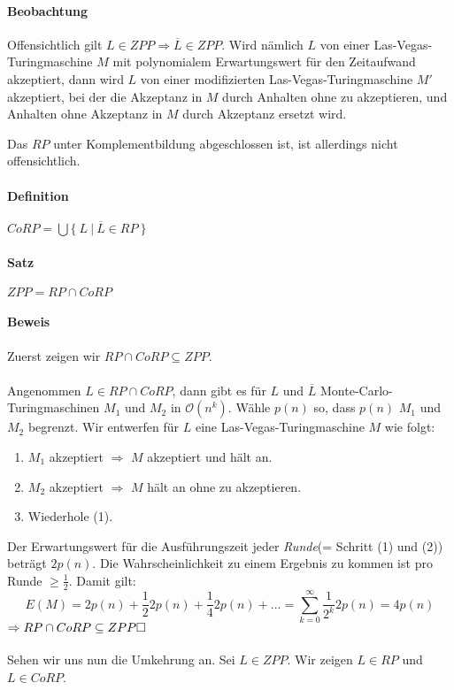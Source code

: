 \paragraph{Beobachtung}
Offensichtlich gilt $L \in ZPP \Rightarrow \overline{L} \in ZPP$.
Wird nämlich $L$ von einer Las-Vegas-Turingmaschine $M$ mit polynomialem Erwartungswert für den Zeitaufwand akzeptiert, dann wird $L$ von einer modifizierten Las-Vegas-Turingmaschine $M'$ akzeptiert, bei der die Akzeptanz in $M$ durch Anhalten ohne zu akzeptieren, und Anhalten ohne Akzeptanz in $M$ durch Akzeptanz ersetzt wird.

Das $RP$ unter Komplementbildung abgeschlossen ist, ist allerdings nicht offensichtlich.

\paragraph{Definition}
$CoRP = \bigcup \bigl\{\ L\ \bigl\lvert\ \overline{L} \in RP\ \}$

\paragraph{Satz}
$ZPP = RP \cap CoRP$

\paragraph{Beweis}
Zuerst zeigen wir $RP \cap CoRP \subseteq ZPP$.\\
\\
Angenommen $L \in RP \cap CoRP$, dann gibt es für $L$ und $\overline{L}$ Monte-Carlo-Turingmaschinen $M_1$ und $M_2$ in $\mathcal{O}(n^k)$.
Wähle $p(n)$ so, dass $p(n)$ $M_1$ und $M_2$ begrenzt.
Wir entwerfen für $L$ eine Las-Vegas-Turingmaschine $M$ wie folgt:
\begin{enumerate}
	\item $M_1$ akzeptiert $\Rightarrow$ $M$ akzeptiert und hält an.
	\item $M_2$ akzeptiert $\Rightarrow$ $M$ hält an ohne zu akzeptieren.
	\item Wiederhole (1).
\end{enumerate}
Der Erwartungswert für die Ausführungszeit jeder \emph{Runde}(= Schritt (1) und (2)) beträgt $2p(n)$.
Die Wahrscheinlichkeit zu einem Ergebnis zu kommen ist pro Runde $\geq \frac{1}{2}$.
Damit gilt:
\begin{equation*}
	E(M) = 2p(n) + \frac{1}{2}2p(n) + \frac{1}{4}2p(n) + ... = \sum\limits_{k=0}^{\infty}\frac{1}{2^k}2p(n) = 4p(n)
\end{equation*}
$\Rightarrow RP \cap CoRP \subseteq ZPP \hfill \Box$\\
\\
Sehen wir uns nun die Umkehrung an.
Sei $L \in ZPP$.
Wir zeigen $L \in RP$ und $L \in CoRP$.

